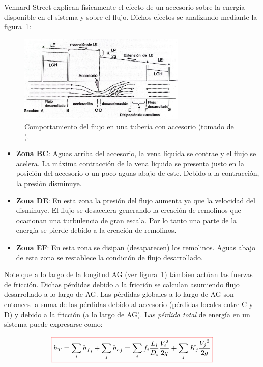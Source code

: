 \documentclass[11pt, oneside]{article}
\begin{document}
Vennard-Street explican  f\'isicamente el efecto de un accesorio sobre la energ\'ia disponible en el sistema y sobre el flujo. Dichos efectos se analizando mediante la figura~\ref{acce1}:

\begin{figure}[h]
\centering
\includegraphics[width=8cm]{acce1.jpeg}
\caption{Comportamiento del flujo en una tuber\'ia con accesorio (tomado de \cite{agudelo2011mecanica}).}
\label{acce1}
\end{figure}

\begin{itemize}
\item \textbf{Zona BC}: Aguas arriba del accesorio, la vena l\'iquida se contrae y el flujo se acelera. La m\'axima contracci\'on de la vena liquida se presenta justo en la posici\'on del accesorio o un poco aguas abajo de este. Debido a la contracci\'on, la presi\'on disminuye. 
\item \textbf{Zona DE}: En esta zona la presi\'on del flujo aumenta ya que la velocidad del  disminuye. El flujo se desacelera generando la creaci\'on de remolinos que ocacionan una turbulencia de gran escala. Por lo tanto una parte de la energ\'ia se pierde debido a la creaci\'on de remolinos. 
\item \textbf{Zona EF}: En esta zona se disipan (desaparecen) los remolinos. Aguas abajo de esta zona se restablece la condici\'on de flujo desarrollado.
\end{itemize}

Note que a lo largo de la longitud AG (ver figura~\ref{acce1}) t\'ambien act\'uan las fuerzas de fricci\'on. Dichas p\'erdidas debido a la fricci\'on se calculan asumiendo flujo desarrollado a lo largo de AG. Las p\'erdidas globales a lo largo de AG son entonces la suma de las p\'erdidas debido al accesorio (p\'erdidas locales entre C y D) y debido a la fricci\'on (a lo largo de AG). Las \emph{p\'erdida total} de energ\'ia en un sistema puede expresarse como:
  
\begin{equation}
\color{red}\boxed{\color{black} h_T = \sum_{i} {h_f}_i + \sum_{j} {h_e}_j =\sum_{i} f_i \frac{L_i }{D_i} \frac{V_i^2}{2g} + \sum_{j} K_j \frac{{V_j}^2}{2g} }
\label{perm1}
\end{equation}
\end{document}
